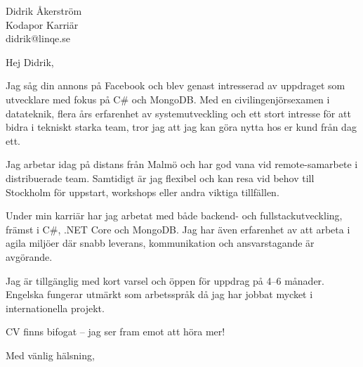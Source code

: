\documentclass[a4paper,10pt]{letter}
\date{\today}
\begin{document}
\begin{letter}{Didrik Åkerström \\ Kodapor Karriär \\ didrik@linqe.se}

\opening{Hej Didrik,}

Jag såg din annons på Facebook och blev genast intresserad av uppdraget som utvecklare med fokus på C\# och MongoDB. Med en civilingenjörsexamen i datateknik, flera års erfarenhet av systemutveckling och ett stort intresse för att bidra i tekniskt starka team, tror jag att jag kan göra nytta hos er kund från dag ett.

Jag arbetar idag på distans från Malmö och har god vana vid remote-samarbete i distribuerade team. Samtidigt är jag flexibel och kan resa vid behov till Stockholm för uppstart, workshops eller andra viktiga tillfällen.

Under min karriär har jag arbetat med både backend- och fullstackutveckling, främst i C\#, .NET Core och MongoDB. Jag har även erfarenhet av att arbeta i agila miljöer där snabb leverans, kommunikation och ansvarstagande är avgörande.

Jag är tillgänglig med kort varsel och öppen för uppdrag på 4–6 månader. Engelska fungerar utmärkt som arbetsspråk då jag har jobbat mycket i internationella projekt.

CV finns bifogat – jag ser fram emot att höra mer!

\closing{Med vänlig hälsning,}

\end{letter}
\end{document}
